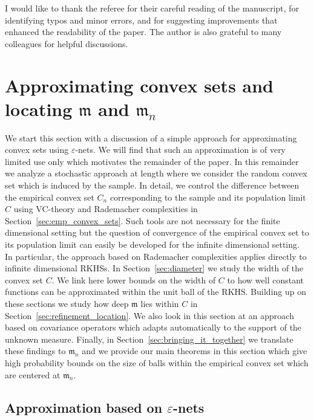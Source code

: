 \documentclass[10pt]{amsart}
\theoremstyle{definition}\newtheorem{defi}[theo]{Definition}\newtheorem{rema}[theo]{Remark}\newtheorem{exam}[theo]{Example}\newtheorem{exem}[theo]{Example}\newtheorem{nota}[theo]{Notation}
\theoremstyle{remark}
\newcommand{\mean}{\mathfrak{m}}
\begin{document}
I would like to thank the referee for their careful reading of the manuscript, for identifying typos and minor errors, and for suggesting improvements that enhanced the readability of the paper. The author is also grateful to many colleagues for helpful discussions.


\section{Approximating convex sets and locating \texorpdfstring{$\mean$}{mean} and \texorpdfstring{$\mean_n$}{mean\_n}} 

We start this section with a discussion of a simple approach for approximating convex sets using $\varepsilon$-nets. We will find that such an approximation is of very limited use only which motivates the remainder of the paper. In this remainder we analyze a stochastic approach at length where we consider the random convex set which is induced by the sample. In detail, we control the difference between the empirical convex set $C_n$ corresponding to the sample and its population limit $C$ using VC-theory and Rademacher complexities in Section~\ref{sec:emp_convex_sets}. Such tools are not necessary for the finite dimensional setting but the question of convergence of the empirical convex set to its population limit can easily be developed for the infinite dimensional setting. In particular, the approach based on Rademacher complexities applies directly to infinite dimensional RKHSs. In Section~\ref{sec:diameter} we study the width of the convex set $C$. We link here lower bounds on the width of $C$ to how well constant functions can be approximated within the unit ball of the RKHS. Building up on these sections we study how deep $\mean$ lies within $C$ in Section~\ref{sec:refinement_location}. We also look in this section at an approach based on covariance operators which adapts automatically to the support of the unknown measure. Finally, in Section~\ref{sec:bringing_it_together} we translate these findings to $\mean_n$ and we provide our main theorems in this section which give high probability bounds on the size of balls within the empirical convex set which are centered at $\mean_n$.

\subsection{Approximation based on \texorpdfstring{$\varepsilon$}{varepsilon}-nets}
\label{ref:approxEpsNet}
\end{document}
